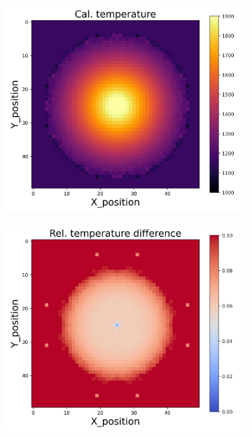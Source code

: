 \begin{figure}[htbp]
    \centering
    \begin{minipage}{\textwidth}
        \centering
        \begin{subfigure}{0.325\textwidth}
            \centering
            \includegraphics[width=\textwidth]{figures/raw_data/21/exp/T_cal.jpg}
        \end{subfigure}
        \begin{subfigure}{0.325\textwidth}
            \centering
            \includegraphics[width=\textwidth]{figures/raw_data/21/exp/T_bias.jpg}

\end{subfigure}
\end{minipage}
\end{figure}
